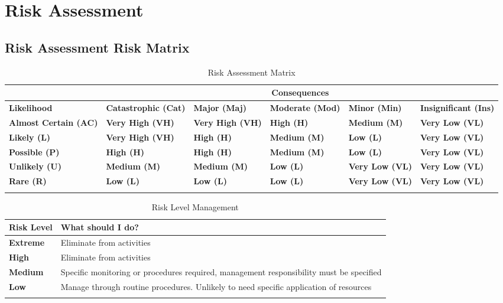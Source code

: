 \section{Risk Assessment}
\subsection{Risk Assessment Risk Matrix}

\begin{longtable}[h!]{ | p{2.25cm} | p{2.25cm} | p{2.25cm} | p{2.25cm} | p{2.25cm} | p{2.25cm} | }\hline
& \multicolumn{5}{|c|}{\textbf{Consequences}}\\\hline
\textbf{Likelihood} & \textbf{Catastrophic (Cat)} & \textbf{Major (Maj)} & \textbf{Moderate (Mod)} & \textbf{Minor (Min)} & \textbf{Insignificant (Ins)} \\\hline
\textbf{Almost Certain (AC)} & \cellcolor{red}\textbf{Very High (VH)} & \cellcolor{red}\textbf{Very High (VH)} & \cellcolor{orange}\textbf{High (H)} & \cellcolor{yellow}\textbf{Medium (M)} & \cellcolor{green}\textbf{Very Low (VL)} \\\hline
\textbf{Likely (L)} & \cellcolor{red}\textbf{Very High (VH)} & \cellcolor{orange}\textbf{High (H)} & \cellcolor{yellow}\textbf{Medium (M)} & \cellcolor{lime}\textbf{Low (L)} & \cellcolor{green}\textbf{Very Low (VL)} \\\hline
\textbf{Possible (P)} & \cellcolor{orange}\textbf{High (H)} & \cellcolor{orange}\textbf{High (H)} & \cellcolor{yellow}\textbf{Medium (M)} & \cellcolor{lime}\textbf{Low (L)} & \cellcolor{green}\textbf{Very Low (VL)} \\\hline
\textbf{Unlikely (U)} & \cellcolor{yellow}\textbf{Medium (M)} & \cellcolor{yellow}\textbf{Medium (M)} & \cellcolor{lime}\textbf{Low (L)} & \cellcolor{green}\textbf{Very Low (VL)} & \cellcolor{green}\textbf{Very Low (VL)} \\\hline 
\textbf{Rare (R)} & \cellcolor{lime}\textbf{Low (L)} & \cellcolor{lime}\textbf{Low (L)} & \cellcolor{lime}\textbf{Low (L)} & \cellcolor{green}\textbf{Very Low (VL)} & \cellcolor{green}\textbf{Very Low (VL)} \\\hline
\caption{Risk Assessment Matrix}
\label{tab:RiskMatrix}
\end{longtable}

\begin{longtable}{ | P{3cm } | P{7cm} | }
\hline
\textbf{Risk Level}& \textbf{What should I do?} \\
\hline
{}\textbf{Extreme}& Eliminate from activities \\
\hline
{}\textbf{High}& Eliminate from activities \\ 
\hline
{}\textbf{Medium}& Specific monitoring or procedures required, management responsibility must be specified \\
\hline
{}\textbf{Low}& Manage through routine procedures. Unlikely to need specific application of resources \\
\hline
\caption{Risk Level Management}
\label{tab:RiskManagement}
\end{longtable}

